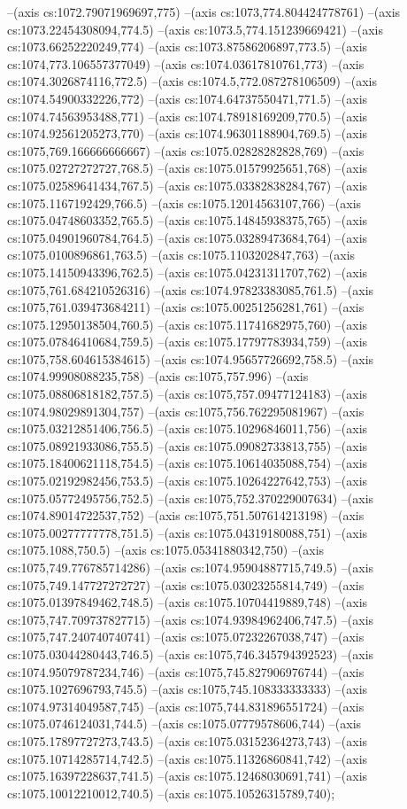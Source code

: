 --(axis cs:1072.79071969697,775)
--(axis cs:1073,774.804424778761)
--(axis cs:1073.22454308094,774.5)
--(axis cs:1073.5,774.151239669421)
--(axis cs:1073.66252220249,774)
--(axis cs:1073.87586206897,773.5)
--(axis cs:1074,773.106557377049)
--(axis cs:1074.03617810761,773)
--(axis cs:1074.3026874116,772.5)
--(axis cs:1074.5,772.087278106509)
--(axis cs:1074.54900332226,772)
--(axis cs:1074.64737550471,771.5)
--(axis cs:1074.74563953488,771)
--(axis cs:1074.78918169209,770.5)
--(axis cs:1074.92561205273,770)
--(axis cs:1074.96301188904,769.5)
--(axis cs:1075,769.166666666667)
--(axis cs:1075.02828282828,769)
--(axis cs:1075.02727272727,768.5)
--(axis cs:1075.01579925651,768)
--(axis cs:1075.02589641434,767.5)
--(axis cs:1075.03382838284,767)
--(axis cs:1075.1167192429,766.5)
--(axis cs:1075.12014563107,766)
--(axis cs:1075.04748603352,765.5)
--(axis cs:1075.14845938375,765)
--(axis cs:1075.04901960784,764.5)
--(axis cs:1075.03289473684,764)
--(axis cs:1075.0100896861,763.5)
--(axis cs:1075.1103202847,763)
--(axis cs:1075.14150943396,762.5)
--(axis cs:1075.04231311707,762)
--(axis cs:1075,761.684210526316)
--(axis cs:1074.97823383085,761.5)
--(axis cs:1075,761.039473684211)
--(axis cs:1075.00251256281,761)
--(axis cs:1075.12950138504,760.5)
--(axis cs:1075.11741682975,760)
--(axis cs:1075.07846410684,759.5)
--(axis cs:1075.17797783934,759)
--(axis cs:1075,758.604615384615)
--(axis cs:1074.95657726692,758.5)
--(axis cs:1074.99908088235,758)
--(axis cs:1075,757.996)
--(axis cs:1075.08806818182,757.5)
--(axis cs:1075,757.09477124183)
--(axis cs:1074.98029891304,757)
--(axis cs:1075,756.762295081967)
--(axis cs:1075.03212851406,756.5)
--(axis cs:1075.10296846011,756)
--(axis cs:1075.08921933086,755.5)
--(axis cs:1075.09082733813,755)
--(axis cs:1075.18400621118,754.5)
--(axis cs:1075.10614035088,754)
--(axis cs:1075.02192982456,753.5)
--(axis cs:1075.10264227642,753)
--(axis cs:1075.05772495756,752.5)
--(axis cs:1075,752.370229007634)
--(axis cs:1074.89014722537,752)
--(axis cs:1075,751.507614213198)
--(axis cs:1075.00277777778,751.5)
--(axis cs:1075.04319180088,751)
--(axis cs:1075.1088,750.5)
--(axis cs:1075.05341880342,750)
--(axis cs:1075,749.776785714286)
--(axis cs:1074.95904887715,749.5)
--(axis cs:1075,749.147727272727)
--(axis cs:1075.03023255814,749)
--(axis cs:1075.01397849462,748.5)
--(axis cs:1075.10704419889,748)
--(axis cs:1075,747.709737827715)
--(axis cs:1074.93984962406,747.5)
--(axis cs:1075,747.240740740741)
--(axis cs:1075.07232267038,747)
--(axis cs:1075.03044280443,746.5)
--(axis cs:1075,746.345794392523)
--(axis cs:1074.95079787234,746)
--(axis cs:1075,745.827906976744)
--(axis cs:1075.1027696793,745.5)
--(axis cs:1075,745.108333333333)
--(axis cs:1074.97314049587,745)
--(axis cs:1075,744.831896551724)
--(axis cs:1075.0746124031,744.5)
--(axis cs:1075.07779578606,744)
--(axis cs:1075.17897727273,743.5)
--(axis cs:1075.03152364273,743)
--(axis cs:1075.10714285714,742.5)
--(axis cs:1075.11326860841,742)
--(axis cs:1075.16397228637,741.5)
--(axis cs:1075.12468030691,741)
--(axis cs:1075.10012210012,740.5)
--(axis cs:1075.10526315789,740);

